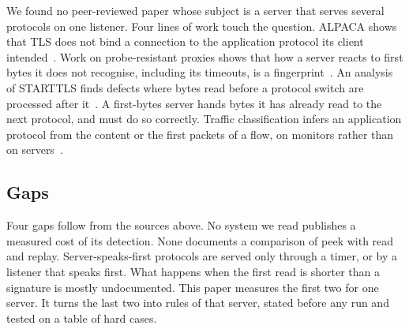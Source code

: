 We found no peer-reviewed paper whose subject is a server that serves several protocols on one
listener. Four lines of work touch the question. ALPACA shows that TLS does not bind a connection
to the application protocol its client intended~\cite{brinkmann2021alpaca}. Work on
probe-resistant proxies shows that how a server reacts to first bytes it does not recognise,
including its timeouts, is a fingerprint~\cite{frolov2020probe,frolov2020httpt}. An analysis of
STARTTLS finds defects where bytes read before a protocol switch are processed after
it~\cite{poddebniak2021starttls}. A first-bytes server hands bytes it has already read to the next
protocol, and must do so correctly. Traffic classification infers an application protocol from
the content or the first packets of a flow, on monitors rather than on
servers~\cite{dreger2006dynamic,deri2014ndpi,bernaille2006fly}.

\subsection{Gaps}\label{sec:gaps}

Four gaps follow from the sources above. No system we read publishes a measured cost of its
detection. None documents a comparison of peek with read and replay. Server-speaks-first
protocols are served only through a timer, or by a listener that speaks first. What happens when
the first read is shorter than a signature is mostly undocumented. This paper measures the first
two for one server. It turns the last two into rules of that server, stated before any run and
tested on a table of hard cases.

